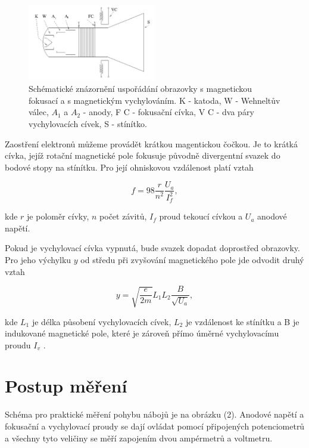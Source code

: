 \documentclass[a4paper,11pt]{article}
\begin{document}
\begin{figure}[h]
    \centering
    \includegraphics[width=0.5\textwidth]{obrazovka.jpg}
    \caption{ Schématické znázornění uspořádání obrazovky s magnetickou fokusací a s magnetickým
vychylováním. K - katoda, W - Wehneltův válec, $ A_1 $  a $ A_2 $  - anody, F C - fokusační cívka, V C -
dva páry vychylovacích cívek, S - stínítko. }
\end{figure}

Zaostření elektronů můžeme provádět krátkou magentickou čočkou. Je to krátká cívka, jejíž rotační magnetické pole fokusuje původně divergentní svazek do bodové stopy na stínítku. Pro její ohniskovou vzdálenost platí vztah

\begin{equation}
f = 98 \frac{r}{n^2} \frac{U_a}{ I_f^2},
\end{equation}

\noindent
kde $ r $  je poloměr cívky, $ n $ počet závitů, $ I_f $ proud tekoucí cívkou a $ U_a $ anodové napětí.

Pokud je vychylovací cívka vypnutá, bude svazek dopadat doprostřed obrazovky. Pro jeho výchylku $ y $ od středu při zvyšování magnetického pole jde odvodit druhý vztah

\begin{equation}
y = \sqrt{\frac{e}{2m}} L_1 L_2 \frac{B}{\sqrt{U_a} },
\end{equation}

\noindent
kde $ L_1 $ je délka působení vychylovacích cívek, $ L_2 $ je vzdálenost ke stínítku a B je indukované magnetické pole, které je zároveň přímo úměrné vychylovacímu proudu $ I_v $ . 

\section{Postup měření}

Schéma pro praktické měření pohybu nábojů je na obrázku (2). Anodové napětí a fokusační a vychylovací proudy se dají ovládat pomocí připojených potenciometrů a všechny tyto veličiny se měří zapojením dvou ampérmetrů a voltmetru. 
\end{document}
